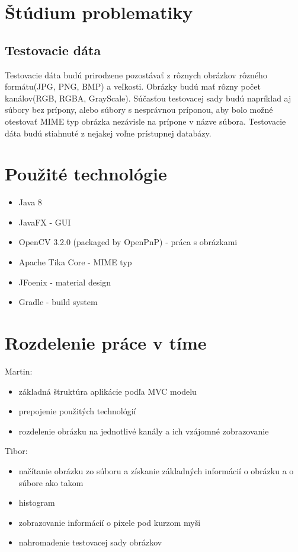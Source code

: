 \documentclass[12pt,a4paper,titlepage,final]{article}
\begin{document}
\section{Štúdium problematiky}
\ifdefined\whos

\fi

\subsection{Testovacie dáta}
Testovacie dáta budú prirodzene pozostávať z rôznych obrázkov rôzného formátu(JPG, PNG, BMP) a veľkosti. Obrázky budú mať rôzny počet kanálov(RGB, RGBA, GrayScale). Súčasťou testovacej sady budú napríklad aj súbory bez prípony, alebo súbory s nesprávnou príponou, aby bolo možné otestovať MIME typ obrázka nezávisle na prípone v názve súbora.
Testovacie dáta budú stiahnuté z nejakej voľne prístupnej databázy.

\section{Použité technológie}
\begin{itemize}
	\item Java 8
	\item JavaFX - GUI
	\item OpenCV 3.2.0 (packaged by OpenPnP) - práca s obrázkami
	\item Apache Tika Core - MIME typ
	\item JFoenix - material design
	\item Gradle - build system
\end{itemize}

\section{Rozdelenie práce v tíme}
Martin:
\begin{itemize}
	\item základná štruktúra aplikácie podľa MVC modelu
	\item prepojenie použitých technológií
	\item rozdelenie obrázku na jednotlivé kanály a ich vzájomné zobrazovanie
\end{itemize}
Tibor:
\begin{itemize}
	\item načítanie obrázku zo súboru a získanie základných informácií o obrázku a o súbore ako takom
	\item histogram
	\item zobrazovanie informácií o pixele pod kurzom myši
	\item nahromadenie testovacej sady obrázkov
\end{itemize}
\end{document}
